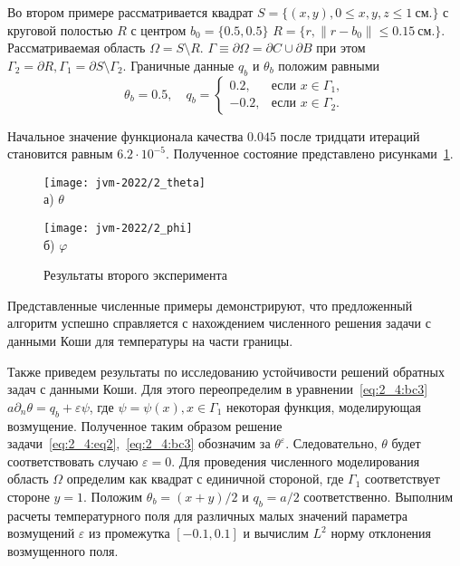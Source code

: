 Во втором примере рассматривается квадрат
$S = \{(x, y), 0 \leq x,y,z \leq 1~\text{см.}\}$ с
круговой полостью $R$ с центром $b_0 =\{0.5, 0.5\}$
$R = \{r, \| r - b_0 \| \leq 0.15~\text{см.} \}$.
Рассматриваемая область $\Omega = S \setminus R$.
$\Gamma \equiv \partial \Omega = \partial C \cup \partial B$ при этом
$ \Gamma_2 = \partial R, \Gamma_1 = \partial S \setminus \Gamma_2$.
Граничные данные $q_b$ и $\theta_b$ положим равными
\[
    \theta_b = 0.5, \quad
    q_b =
    \begin{cases}
        0.2, & \text{если } x \in \Gamma_1, \\
        -0.2, & \text{если } x \in \Gamma_2.
    \end{cases}
\]

Начальное значение функционала качества $0.045$
после тридцати итераций становится равным $6.2\cdot10^{-5}$.
Полученное состояние представлено рисунками~\ref{fig:4_4:6}.

\begin{figure}[h!t]
    \begin{minipage}[b][][b]{0.49\linewidth}
        \centering
        \texttt{[image: jvm-2022/2\_theta]}
        \\ а) $\theta$
    \end{minipage}
    \hfill
    \begin{minipage}[b][][b]{0.49\linewidth}
        \centering
        \texttt{[image: jvm-2022/2\_phi]}
        \\ б) $\varphi$
    \end{minipage}
    \caption{Результаты второго эксперимента}
    \label{fig:4_4:6}
\end{figure}


Представленные численные примеры демонстрируют, что предложенный
алгоритм успешно справляется с нахождением численного решения задачи
с данными Коши для температуры на части границы.


Также приведем результаты по исследованию устойчивости решений
обратных задач с данными Коши.
Для этого переопределим в уравнении~\eqref{eq:2_4:bc3} $a\partial_n \theta = q_b +\varepsilon \psi$,
где $\psi = \psi(x), x \in \Gamma_1$ некоторая функция, моделирующая возмущение.
Полученное таким образом решение задачи~\eqref{eq:2_4:eq2},~\eqref{eq:2_4:bc3}
обозначим за $\theta^{\varepsilon}$.
Следовательно, $\theta$ будет соответствовать случаю $\varepsilon = 0$.
Для проведения численного моделирования область $\Omega$ определим
как квадрат с единичной стороной, где $\Gamma_1$ соответствует стороне $y = 1$.
Положим $\theta_b = (x + y) / 2$ и $q_b = a / 2$ соответственно.
Выполним расчеты температурного поля
для различных малых значений параметра возмущений $\varepsilon$
из промежутка $[-0.1, 0.1]$ и вычислим $L^2$ норму отклонения возмущенного поля.


